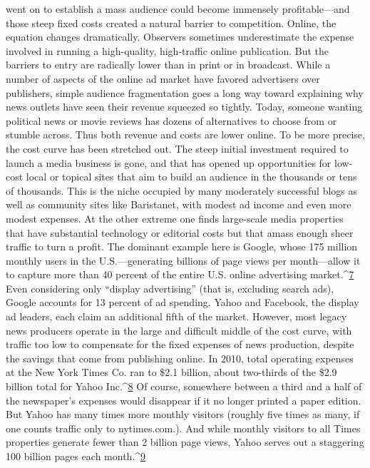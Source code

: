 went on to establish a mass audience could become immensely profitable—and
those steep fixed costs created a natural barrier to competition.
Online, the equation changes dramatically. Observers sometimes underestimate
the expense involved in running a high-quality, high-traffic online publication.
But the barriers to entry are radically lower than in print or in broadcast. While
a number of aspects of the online ad market have favored advertisers over publishers,
simple audience fragmentation goes a long way toward explaining why
news outlets have seen their revenue squeezed so tightly. Today, someone wanting
political news or movie reviews has dozens of alternatives to choose from or
stumble across.
Thus both revenue and costs are lower online. To be more precise, the cost
curve has been stretched out. The steep initial investment required to launch
a media business is gone, and that has opened up opportunities for low-cost
local or topical sites that aim to build an audience in the thousands or tens of
thousands. This is the niche occupied by many moderately successful blogs as
well as community sites like Baristanet, with modest ad income and even more
modest expenses.
At the other extreme one finds large-scale media properties that have substantial
technology or editorial costs but that amass enough sheer traffic to turn a
profit. The dominant example here is Google, whose 175 million monthly users
in the U.S.—generating billions of page views per month—allow it to capture
more than 40 percent of the entire U.S. online advertising market.^{\href{#endnotes-ch7}{7}} Even considering
only ``display advertising'' (that is, excluding search ads), Google accounts
for 13 percent of ad spending. Yahoo and Facebook, the display ad leaders, each
claim an additional fifth of the market.
However, most legacy news producers operate in the large and difficult middle
of the cost curve, with traffic too low to compensate for the fixed expenses
of news production, despite the savings that come from publishing online. In
2010, total operating expenses at the New York Times Co. ran to \$2.1 billion,
about two-thirds of the \$2.9 billion total for Yahoo Inc.^{\href{#endnotes-ch7}{8}} Of course, somewhere
between a third and a half of the newspaper’s expenses would disappear if it no
longer printed a paper edition. But Yahoo has many times more monthly visitors
(roughly five times as many, if one counts traffic only to nytimes.com.). And
while monthly visitors to all Times properties generate fewer than 2 billion page
views, Yahoo serves out a staggering 100 billion pages each month.^{\href{#endnotes-ch7}{9}}
